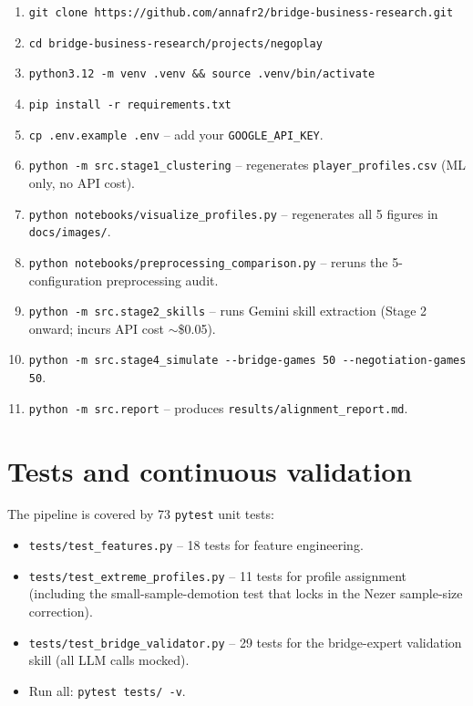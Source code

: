 \documentclass[11pt, a4paper, oneside, openany]{report}
\begin{document}
\begin{enumerate}[leftmargin=*]
    \item \texttt{git clone https://github.com/annafr2/bridge-business-research.git}
    \item \texttt{cd bridge-business-research/projects/negoplay}
    \item \texttt{python3.12 -m venv .venv \&\& source .venv/bin/activate}
    \item \texttt{pip install -r requirements.txt}
    \item \texttt{cp .env.example .env} -- add your \texttt{GOOGLE\_API\_KEY}.
    \item \texttt{python -m src.stage1\_clustering} -- regenerates \texttt{player\_profiles.csv} (ML only, no API cost).
    \item \texttt{python notebooks/visualize\_profiles.py} -- regenerates all 5 figures in \texttt{docs/images/}.
    \item \texttt{python notebooks/preprocessing\_comparison.py} -- reruns the 5-configuration preprocessing audit.
    \item \texttt{python -m src.stage2\_skills} -- runs Gemini skill extraction (Stage 2 onward; incurs API cost $\sim$\$0.05).
    \item \texttt{python -m src.stage4\_simulate -{}-bridge-games 50 -{}-negotiation-games 50}.
    \item \texttt{python -m src.report} -- produces \texttt{results/alignment\_report.md}.
\end{enumerate}

\section{Tests and continuous validation}

The pipeline is covered by 73 \texttt{pytest} unit tests:

\begin{itemize}[leftmargin=*]
    \item \texttt{tests/test\_features.py} -- 18 tests for feature engineering.
    \item \texttt{tests/test\_extreme\_profiles.py} -- 11 tests for profile assignment (including the small-sample-demotion test that locks in the Nezer sample-size correction).
    \item \texttt{tests/test\_bridge\_validator.py} -- 29 tests for the bridge-expert validation skill (all LLM calls mocked).
    \item Run all: \texttt{pytest tests/ -v}.
\end{itemize}


\end{document}
